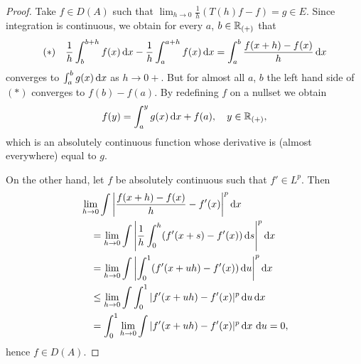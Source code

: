 \begin{proof}
Take $f \in D(A)$ such that $\lim_{h \to 0} \frac{1}{h}(T(h)f - f) = g \in E$.
Since integration is continuous, we obtain for every $a$, $b \in \mathbb{R}_{(+)}$ that
\begin{equation*}\label{eq:a1-2.1}
(*) \quad \frac{1}{h}\int_{b}^{b+h} f(x) \mathop{}\!\mathrm{d}{x} - \frac{1}{h}\int_{a}^{a+h} f(x) \mathop{}\!\mathrm{d}{x} = \int_{a}^{b} \frac{f(x+h) - f(x)}{h} \mathop{}\!\mathrm{d}{x}
\end{equation*}
converges to $\int_{a}^{b} g(x) \mathop{}\!\mathrm{d}{x}$ as $h \to 0+$.
But for almost all $a$, $b$ the left hand side of\/ $(*)$ converges to $f(b) - f(a)$.
By redefining $f$ on a nullset we obtain
\[
    f(y) = \int_{a}^{y} g(x)\mathop{}\!\mathrm{d}{x} + f(a), \quad y \in \mathbb{R}_{(+)},
\]
which is an absolutely continuous function whose derivative is (almost everywhere) equal to $g$.

On the other hand, let $f$ be absolutely continuous such that $f' \in L^{p}$.
Then
\begin{align*}
    &\lim_{h \to 0} \int\left|\frac{f(x+h) - f(x)}{h} - f'(x)\right|^{p} \dx \\
    &\quad= \lim_{h \to 0} \int \left|\frac{1}{h}\int_{0}^{h} (f'(x+s) - f'(x)) \ds\right|^{p} \dx \\
    &\quad= \lim_{h \to 0} \int \left|\int_{0}^{1} (f'(x+uh) - f'(x)) \du\right|^{p} \dx \\
    &\quad\leq \lim_{h \to 0} \int \int_{0}^{1} |f'(x+uh) - f'(x)|^p \du \dx \\
    &\quad= \int_{0}^{1} \lim_{h \to 0} \int|f'(x+uh) - f'(x)|^{p} \dx \, \du = 0,
\end{align*}
hence $f \in D(A)$.
\end{proof}
